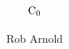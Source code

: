 \documentclass{article}
\title{${\rm C}_0$}
\date{}
\author{Rob Arnold}
\begin{document}
\maketitle





\newcommand{\startdef}[2]{\ensuremath{#1} & ::= & \ensuremath{#2} \\}
\newcommand{\contdef}[1]{ &$\vert$ & \ensuremath{#1} \\}
\newcommand{\OR}{\ensuremath{\ | \ }}
\newcommand{\boxed}[1]{\fbox{\ensuremath{#1}}}

\newcommand{\kw}[1]{{\bf #1}}
\newcommand{\langname}{${\rm C}_0$}


\end{document}
